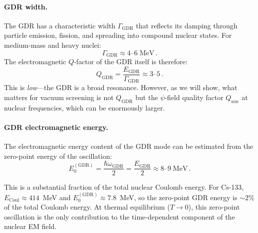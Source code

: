 \documentclass[aps,prd,twocolumn,superscriptaddress,nofootinbib]{revtex4-2}
\newcommand{\Qnuc}{Q_{\mathrm{nuc}}}
\newcommand{\wGDR}{\omega_{\mathrm{GDR}}}
\newcommand{\Ecoul}{E_{\mathrm{Coul}}}
\newcommand{\EGDR}{E_{\mathrm{GDR}}}
\begin{document}
\paragraph{GDR width.}
The GDR has a characteristic width $\Gamma_{\mathrm{GDR}}$ that
reflects its damping through particle emission, fission, and spreading
into compound nuclear states.  For medium-mass and heavy nuclei:
\begin{equation}\label{eq:gdr-width}
\Gamma_{\mathrm{GDR}} \approx 4\text{--}6\;\mathrm{MeV}\,.
\end{equation}
The electromagnetic $Q$-factor of the GDR itself is therefore:
\begin{equation}\label{eq:q-gdr}
Q_{\mathrm{GDR}} = \frac{\EGDR}{\Gamma_{\mathrm{GDR}}}
\approx 3\text{--}5\,.
\end{equation}
This is \emph{low}---the GDR is a broad resonance.  However, as we
will show, what matters for vacuum screening is not $Q_{\mathrm{GDR}}$
but the $\psi$-field quality factor $\Qnuc$ at nuclear frequencies,
which can be enormously larger.

\paragraph{GDR electromagnetic energy.}
The electromagnetic energy content of the GDR mode can be estimated
from the zero-point energy of the oscillation:
\begin{equation}\label{eq:gdr-zpe}
E_0^{(\mathrm{GDR})} = \frac{\hbar\wGDR}{2}
= \frac{\EGDR}{2} \approx 8\text{--}9\;\mathrm{MeV}\,.
\end{equation}

This is a substantial fraction of the total nuclear Coulomb energy.
For Cs-133, $\Ecoul \approx 414$~MeV and $E_0^{(\mathrm{GDR})}
\approx 7.8$~MeV, so the zero-point GDR energy is $\sim\!2\%$ of the
total Coulomb energy.  At thermal equilibrium ($T \to 0$), this
zero-point oscillation is the only contribution to the time-dependent
component of the nuclear EM field.
\end{document}
